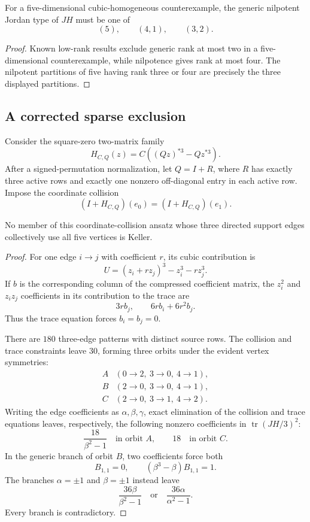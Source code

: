 \begin{proposition}
\label{prop:n5-jordan-types}
For a five-dimensional cubic-homogeneous counterexample, the generic
nilpotent Jordan type of \(JH\) must be one of
\[
(5),\qquad(4,1),\qquad(3,2).
\]
\end{proposition}

\begin{proof}
Known low-rank results exclude generic rank at most two in a
five-dimensional counterexample, while nilpotence gives rank at most four.
The nilpotent partitions of five having rank three or four are precisely the
three displayed partitions.
\end{proof}

\subsection{A corrected sparse exclusion}

Consider the square-zero two-matrix family
\[
H_{C,Q}(z)=C\left((Qz)^{*3}-Qz^{*3}\right).
\]
After a signed-permutation normalization, let \(Q=I+R\), where \(R\) has
exactly three active rows and exactly one nonzero off-diagonal entry in each
active row.  Impose the coordinate collision
\[
(I+H_{C,Q})(e_0)=(I+H_{C,Q})(e_1).
\]

\begin{theorem}
\label{thm:n5-sparse}
No member of this coordinate-collision ansatz whose three directed support
edges collectively use all five vertices is Keller.
\end{theorem}

\begin{proof}
For one edge \(i\to j\) with coefficient \(r\), its cubic contribution is
\[
U=(z_i+rz_j)^3-z_i^3-rz_j^3.
\]
If \(b\) is the corresponding column of the compressed coefficient matrix,
the \(z_i^2\) and \(z_iz_j\) coefficients in its contribution to the trace
are
\[
3rb_j,\qquad 6rb_i+6r^2b_j.
\]
Thus the trace equation forces \(b_i=b_j=0\).

There are \(180\) three-edge patterns with distinct source rows.
The collision and trace constraints leave \(30\), forming three orbits under
the evident vertex symmetries:
\[
\begin{array}{c|c}
A&(0\to2,\ 3\to0,\ 4\to1),\\
B&(2\to0,\ 3\to0,\ 4\to1),\\
C&(2\to0,\ 3\to1,\ 4\to2).
\end{array}
\]
Writing the edge coefficients as \(\alpha,\beta,\gamma\), exact
elimination of the collision and trace equations leaves, respectively, the
following nonzero coefficients in
\(\operatorname{tr}(JH/3)^2\):
\[
\frac{18}{\beta^2-1}\quad\text{in orbit \(A\)},\qquad
18\quad\text{in orbit \(C\)}.
\]
In the generic branch of orbit \(B\), two coefficients force both
\[
B_{1,1}=0,\qquad(\beta^3-\beta)B_{1,1}=1.
\]
The branches \(\alpha=\pm1\) and \(\beta=\pm1\) instead leave
\[
\frac{36\beta}{\beta^2-1}
\quad\text{or}\quad
\frac{36\alpha}{\alpha^2-1}.
\]
Every branch is contradictory.
\end{proof}

